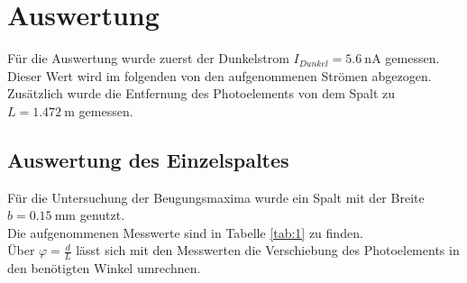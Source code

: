\section{Auswertung}

\noindent Für die Auswertung wurde zuerst der Dunkelstrom $I_{Dunkel}=\SI{5.6}{\nano\ampere}$ gemessen. Dieser Wert wird im folgenden von den aufgenommenen Strömen abgezogen.\\
Zusätzlich wurde die Entfernung des Photoelements von dem Spalt zu $L=\SI{1.472}{\metre}$ gemessen.

\subsection{Auswertung des Einzelspaltes}

\noindent Für die Untersuchung der Beugungsmaxima wurde ein Spalt mit der Breite $b=\SI{0.15}{\milli\metre}$ genutzt.\\
Die aufgenommenen Messwerte sind in Tabelle \ref{tab:1} zu finden.\\ Über $\varphi=\frac{d}{L}$ lässt sich mit den Messwerten die Verschiebung des Photoelements in den benötigten Winkel umrechnen.

